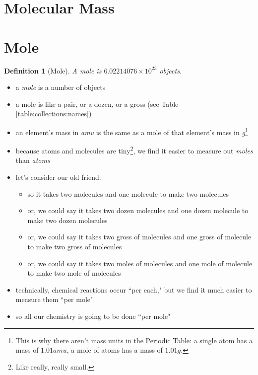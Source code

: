 \documentclass[11pt, oneside]{article}   	%
\newtheorem{definition}{Definition}
\begin{document}
\section{Molecular Mass}


\section{Mole}

\begin{definition}[Mole]\label{defn:mole}
A mole is $6.02214076 \times 10^{23}$  objects.
\end{definition}

\begin{itemize}
\item a \emph{mole} is a number of objects
\item a mole is like a pair, or a dozen, or a gross (see Table \ref{table:collections:names})
\item an element's mass in \emph{amu} is the same as a mole of that element's mass in \emph{g}\footnote{This is why there aren't mass units in the Periodic Table: a single  atom has a mass of $1.01 amu$, a mole of  atoms has a mass of $1.01 g$.}
\item because atoms and molecules are tiny\footnote{Like really, really small.}, we find it easier to measure out \emph{moles} than \emph{atoms}
\item let's consider our old friend: 
\begin{itemize}
\item so it takes two  molecules and one  molecule to make two  molecules
\item or, we could say it takes two dozen  molecules and one dozen  molecule to make two dozen  molecules
\item or, we could say it takes two gross of  molecules and one gross of  molecule to make two gross of  molecules
\item or, we could say it takes two moles of  molecules and one mole of  molecule to make two mole of  molecules
\end{itemize}
\item technically, chemical reactions occur ``per each," but we find it much easier to measure them ``per mole"
\item so all our chemistry is going to be done ``per mole" 
\end{itemize}
\end{document}

